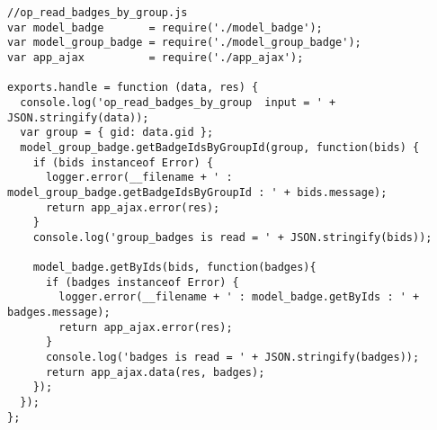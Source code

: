 
\small
\lstset{basicstyle=\ttfamily,breaklines=true}
\begin{lstlisting}
//op_read_badges_by_group.js
var model_badge       = require('./model_badge');
var model_group_badge = require('./model_group_badge');
var app_ajax          = require('./app_ajax');

exports.handle = function (data, res) {
  console.log('op_read_badges_by_group  input = ' + JSON.stringify(data));
  var group = { gid: data.gid };
  model_group_badge.getBadgeIdsByGroupId(group, function(bids) {
    if (bids instanceof Error) {
      logger.error(__filename + ' : model_group_badge.getBadgeIdsByGroupId : ' + bids.message);
      return app_ajax.error(res);
    }
    console.log('group_badges is read = ' + JSON.stringify(bids));
    
    model_badge.getByIds(bids, function(badges){
      if (badges instanceof Error) {
        logger.error(__filename + ' : model_badge.getByIds : ' + badges.message);
        return app_ajax.error(res);
      }
      console.log('badges is read = ' + JSON.stringify(badges));
      return app_ajax.data(res, badges);
    });
  });
};


\end{lstlisting}

